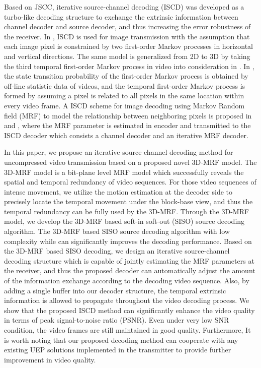 \documentclass[10pt,twocolumn,twoside]{IEEEtran}
\begin{document}
Based on JSCC, iterative source-channel decoding (ISCD) \cite{ISCD, ISCD2, ISCD3, ISCD4, ISCD5} was developed as a turbo-like \cite{turbocode} decoding structure to exchange the extrinsic information between channel decoder and source decoder, and thus increasing the error robustness of the receiver. In \cite{ISCD_image}, ISCD is used for image transmission with the assumption that each image pixel is constrained by two first-order Markov processes in horizontal and vertical directions. The same model is generalized from 2D to 3D by taking the third temporal first-order Markov process in video into consideration in \cite{ISCD_st}. In \cite{ISCD_st}, the state transition probability of the first-order Markov process is obtained by off-line statistic data of videos, and the temporal first-order Markov process is formed by assuming a pixel is related to all pixels in the same location within every video frame. A ISCD scheme for image decoding using Markov Random field (MRF) to model the relationship between neighboring pixels is proposed in \cite{ISCD_MRF} and \cite{ISCD_MRF2}, where the MRF parameter is estimated in encoder and transmitted to the ISCD decoder which consists a channel decoder and an iterative MRF decoder.

In this paper, we propose an iterative source-channel decoding method for uncompressed video transmission based on a proposed novel 3D-MRF model. The 3D-MRF model is a bit-plane level MRF model which successfully reveals the spatial and temporal redundancy of video sequences. For those video sequences of intense movement, we utilize the motion estimation at the decoder side to precisely locate the temporal movement under the block-base view, and thus the temporal redundancy can be fully used by the 3D-MRF. Through the 3D-MRF model, we develop the 3D-MRF based soft-in soft-out (SISO) source decoding algorithm. The 3D-MRF based SISO source decoding algorithm with low complexity while can significantly improves the decoding performance. Based on the 3D-MRF based SISO decoding, we design an iterative source-channel decoding structure which is capable of jointly estimating the MRF parameters at the receiver, and thus the proposed decoder can automatically adjust the amount of the information exchange according to the decoding video sequence. Also, by adding a single buffer into our decoder structure, the temporal extrinsic information is allowed to propagate throughout the video decoding process. We show that the proposed ISCD method can significantly enhance the video quality in terms of peak signal-to-noise ratio (PSNR). Even under very low SNR condition, the video frames are still maintained in good quality. Furthermore, It is worth noting that our proposed decoding method can cooperate with any existing UEP solutions implemented in the transmitter to provide further improvement in video quality.
\end{document}
